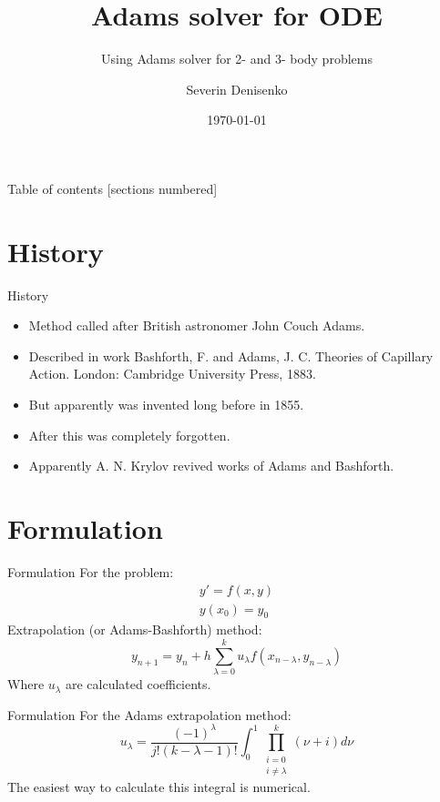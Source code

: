 \documentclass[10pt]{beamer}
\title{Adams solver for ODE}
\subtitle{Using Adams solver for 2- and 3- body problems}
\date{\today}
\author{Severin Denisenko}
\institute{Saint Petersburg State University}
\begin{document}
\maketitle

\begin{frame}{Table of contents}
  [sections numbered]
  \tableofcontents%
\end{frame}

\section[History]{History}

\begin{frame}{History}
	\begin{itemize}
		\item Method called after British astronomer John Couch Adams.
		\item Described in work Bashforth, F. and Adams, J. C. Theories of Capillary Action. London: Cambridge University Press, 1883.
		\item But apparently was invented long before in 1855.
		\item After this was completely forgotten.
        \item Apparently A. N. Krylov revived works of Adams and Bashforth.
	\end{itemize}
\end{frame}

\section[Formulation]{Formulation}

\begin{frame}{Formulation}
  For the problem:
  \begin{gather*}
      y'=f(x,y) \\
      y(x_0)=y_0
  \end{gather*}
  Extrapolation (or Adams-Bashforth) method:
  \begin{equation}
      y_{n+1} = y_n + h \sum_{\lambda=0}^{k} u_{\lambda}f(x_{n-\lambda}, y_{n-\lambda})
  \end{equation}
  Where $u_{\lambda}$ are calculated coefficients.
\end{frame}

\begin{frame}{Formulation}
  For the Adams extrapolation method:
  \begin{equation*}
      u_{\lambda} = \frac{(-1)^\lambda}{j!(k-\lambda-1)!} \int_{0}^{1} \prod_{ \substack{i=0 \\ i\neq\lambda}}^{k} (\nu+i) d \nu
  \end{equation*}
  The easiest way to calculate this integral is numerical.
\end{frame}
\end{document}
